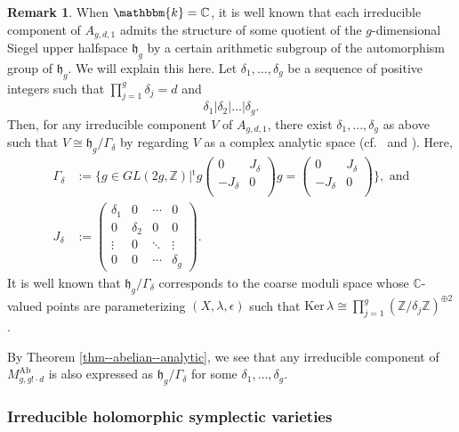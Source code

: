 \documentclass[12pt,twoside]{amsart}
\theoremstyle{definition}
\newtheorem{rem}[thm]{Remark}
\begin{document}
\begin{rem}\label{rem--abelian--period}
When $\mathbbm{k}=\mathbb{C}$, it is well known that each irreducible component of $A_{g,d,1}$ admits the structure of some quotient of the $g$-dimensional Siegel upper halfspace $\mathfrak{h}_g$ by a certain arithmetic subgroup of the automorphism group of $\mathfrak{h}_g$.
We will explain this here.
Let $\delta_1,\ldots,\delta_g$ be a sequence of positive integers such that $\prod_{j=1}^g\delta_j=d$ and 
\[
\delta_1|\delta_2|\ldots|\delta_g.
\]
Then, for any irreducible component $V$ of $A_{g,d,1}$, there exist $\delta_1,\ldots,\delta_g$ as above such that $V\cong \mathfrak{h}_g/\Gamma_\delta$ by regarding $V$ as a complex analytic space
(cf.~\cite[Appendix to Chap.~7, A]{GIT} and \cite[Section 2]{fujino--canonical-certain}).
Here, 
\begin{align*}
\Gamma_\delta&:=\Bigg\{g\in GL(2g,\mathbb{Z})\Bigg|\text{}^{\mathrm{t}}g\begin{pmatrix}
0 & J_{\delta} \\
-J_{\delta} & 0 \\
\end{pmatrix}g=\begin{pmatrix}
0 & J_{\delta} \\
-J_{\delta} & 0 \\
\end{pmatrix}
\Bigg\}, \text{ and}\\
J_\delta&:=\begin{pmatrix}
\delta_1 & 0 & \cdots & 0 \\
0 & \delta_2 &    0    &    0    \\
\vdots &  0  & \ddots &    \vdots \\
0 &     0   &   \cdots     & \delta_g
\end{pmatrix}.
\end{align*}
It is well known that $\mathfrak{h}_g/\Gamma_\delta$ corresponds to the coarse moduli space whose $\mathbb{C}$-valued points are parameterizing $(X,\lambda,\epsilon)$ such that $\mathrm{Ker}\,\lambda\cong \prod_{j=1}^g(\mathbb{Z}/\delta_j\mathbb{Z})^{\oplus 2}$.

By Theorem \ref{thm--abelian--analytic}, we see that any irreducible component of $M^{\mathrm{Ab}}_{g,g!\cdot d}$ is also expressed as $\mathfrak{h}_g/\Gamma_\delta$ for some $\delta_1,\ldots,\delta_g$.
\end{rem}

\subsubsection{Irreducible holomorphic symplectic varieties}
\end{document}
